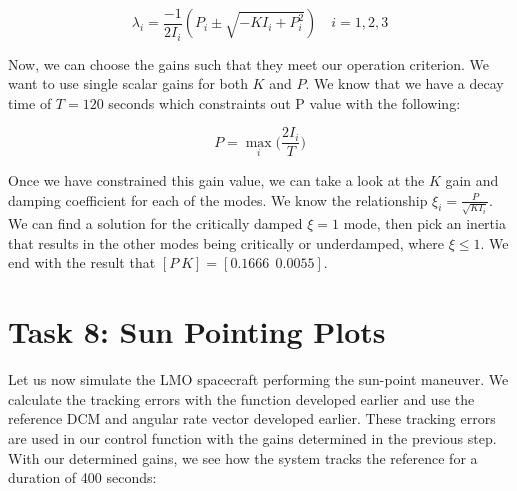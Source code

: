 \documentclass[paper]{aiaaNew}
\begin{document}
\begin{equation}
  \lambda_i = \frac{-1}{2I_i} \left(P_{i} \pm \sqrt{-K I_{i}+P_{i}^{2}}\right) \quad i=1,2,3
\end{equation}

Now, we can choose the gains such that they meet our operation criterion. We want to use single scalar gains for both $K$ and $P$. We know that we have a decay time of $T=120$ seconds which constraints out P value with the following:

\begin{equation}
  P = \max_i \bigg (\frac{2I_i}{T}  \bigg)
\end{equation}

Once we have constrained this gain value, we can take a look at the $K$ gain and damping coefficient for each of the modes. We know the relationship $\xi_i=\frac{P}{\sqrt{KI_i}}$. We can find a solution for the critically damped $\xi = 1$ mode, then pick an inertia that results in the other modes being critically or underdamped, where $\xi \leq 1 $. We end with the result that $[P \  K] = [0.1666  \ \ 0.0055]$.









\section*{Task 8: Sun Pointing Plots}
Let us now simulate the LMO spacecraft performing the sun-point maneuver. We calculate the tracking errors with the function developed earlier and use the reference DCM and angular rate vector developed earlier. These tracking errors are used in our control function with the gains determined in the previous step. With our determined gains, we see how the system tracks the reference for a duration of 400 seconds:
\end{document}
